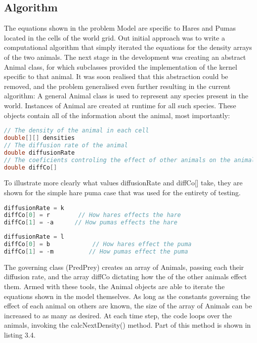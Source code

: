 \documentclass[11pt]{report}
\begin{document}
\subsection{Algorithm} %
      \label{sec:Algorithm}
      The equations shown in the problem Model are specific to Hares and Pumas located in the cells of the world grid. Out initial approach was to write a computational algorithm that simply iterated the equations for the density arrays of the two animals. The next stage in the development was creating an abstract Animal class, for which subclasses provided the implementation of the kernel specific to that animal. It was soon realised that this abstraction could be removed, and the problem generalised even further resulting in the current algorithm: A general Animal class is used to represent any species present in the world. Instances of Animal are created at runtime for all such species. These objects contain all of the information about the animal, most importantly: 
\begin{lstlisting}[numbers=none, language=Java,caption=The fundamental fields of the animal class.]
// The density of the animal in each cell
double[][] densities
// The diffusion rate of the animal     
double diffusionRate
// The coeficients controling the effect of other animals on the animal
double diffCo[] 
\end{lstlisting}

      To illustrate more clearly what values diffusionRate and diffCo[] take, they are shown for the simple hare puma case that was used for the entirety of testing.
      
\begin{lstlisting}[numbers=none, language=Java,caption=Behavioural coefficients for the hare instance of animal.]
diffusionRate = k
diffCo[0] = r		 // How hares effects the hare
diffCo[1] = -a		// How pumas effects the hare
\end{lstlisting} \begin{lstlisting}[numbers=none, language=Java,caption=Behavioural coefficients for the puma instance of animal.]
diffusionRate = l
diffCo[0] = b			 // How hares effect the puma
diffCo[1] = -m			// How pumas effect the puma
\end{lstlisting}

The governing class (PredPrey) creates an array of Animals, passing each their diffusion rate, and the array diffCo dictating how the of the other animals effect them. Armed with these tools, the Animal objects are able to iterate the equations shown in the model themselves. As long as the constants governing the effect of each animal on others are known, the size of the array of Animals can be increased to as many as desired. At each time step, the code loops over the animals, invoking the calcNextDensity() method. Part of this method is shown in listing 3.4.
\end{document}
